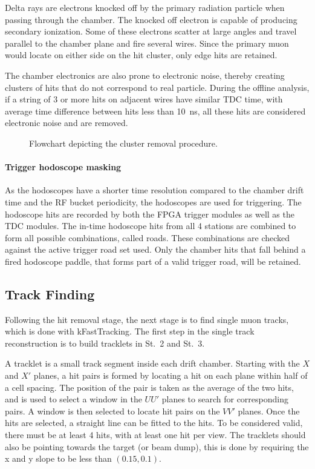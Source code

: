 \documentclass[../main.tex]{subfiles}
\begin{document}
Delta rays are electrons knocked off by the primary radiation particle when passing
through the chamber. The knocked off electron is capable of producing secondary ionization.
Some of these electrons scatter at large angles and travel parallel to the chamber plane
and fire several wires. Since the primary muon would locate on either side on the hit cluster,
only edge hits are retained.

The chamber electronics are also prone to electronic noise, thereby creating clusters of
hits that do not correspond to real particle. During the offline analysis, if a string of
3 or more hits on adjacent wires have similar TDC time, with average time difference between
hits less than \SI{10}{\ns}, all these hits are considered electronic noise and are removed.
\begin{figure}
	\centering
	
	\caption{Flowchart depicting the cluster removal procedure.}
	\label{fig:cluster_cuts}
\end{figure}

\paragraph{Trigger hodoscope masking}
As the hodoscopes have a shorter time resolution compared to the chamber drift time and
the RF bucket periodicity, the hodoscopes are used for triggering. The hodoscope hits
are recorded by both the FPGA trigger modules as well as the TDC modules. The in-time hodoscope
hits from all 4 stations are combined to form all possible combinations, called roads. These
combinations are checked against the active trigger road set used. Only the chamber hits
that fall behind a fired hodoscope paddle, that forms part of a valid trigger road, will be retained.


\subsection{Track Finding}
Following the hit removal stage, the next stage is to find single muon tracks, which is done with kFastTracking.
The first step in the single track reconstruction is to build tracklets in St.~2 and St.~3.

A tracklet is a small track segment inside each drift chamber. Starting with the $X$ and
$X'$ planes, a hit pairs is formed by locating a hit on each plane within half of a cell spacing.
The position of the pair is taken as the average of the two hits, and is used to select a window
in the $UU'$ planes to search for corresponding pairs. A window is then selected to locate hit pairs
on the $VV'$ planes. Once the hits are selected, a straight line can be fitted to the hits.
To be considered valid, there must be at least 4 hits, with at least one hit per view. The tracklets
should also be pointing towards the target (or beam dump), this is done by requiring the x and y slope to be
less than $(0.15,0.1)$.
\end{document}
